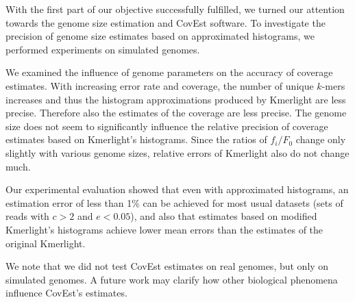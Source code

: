 \medskip

With the first part of our objective successfully fulfilled, we turned our attention towards
the genome size estimation and CovEst software. To investigate the precision of genome size 
estimates based on approximated histograms, we performed experiments on simulated genomes.

We examined the influence of genome parameters on the accuracy of coverage estimates.
With increasing error rate and coverage, the number of unique $k$-mers increases
and thus the histogram approximations produced by Kmerlight are less precise. Therefore
also the estimates of the coverage are less precise. The genome size does not seem to 
significantly influence the relative precision of coverage estimates based on Kmerlight's
histograms. Since the ratios of $f_i/F_0$ change only slightly with
various genome sizes, relative errors of Kmerlight also do not change much.

Our experimental evaluation showed that even with approximated histograms, an estimation error
of less than 1\% can be achieved for most usual datasets (sets of reads with $c > 2$ 
and $e < 0.05$), and also that estimates based on modified Kmerlight's histograms achieve 
lower mean errors than the estimates of the original Kmerlight. 

We note that we did not test CovEst estimates on real genomes, but only on simulated genomes. 
A future work may clarify how other biological phenomena influence CovEst's estimates. 

